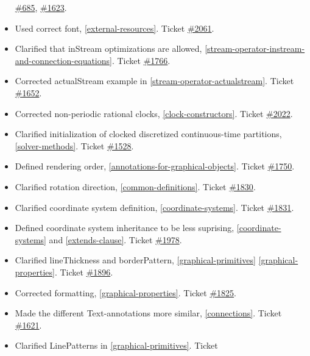 \documentclass[../MLS.tex]{subfiles}
\begin{document}
\begin{itemize}
  \href{https://trac.modelica.org/Modelica/ticket/685}{\#685},
  \href{https://trac.modelica.org/Modelica/ticket/1623}{\#1623}.
\item
  Used correct font, \autoref{external-resources}. Ticket
  \href{https://trac.modelica.org/Modelica/ticket/2061}{\#2061}.
\item
  Clarified that inStream optimizations are allowed, \autoref{stream-operator-instream-and-connection-equations}.
  Ticket \href{https://trac.modelica.org/Modelica/ticket/1766}{\#1766}.
\item
  Corrected actualStream example in \autoref{stream-operator-actualstream}. Ticket
  \href{https://trac.modelica.org/Modelica/ticket/1652}{\#1652}.
\item
  Corrected non-periodic rational clocks, \autoref{clock-constructors}. Ticket
  \href{https://trac.modelica.org/Modelica/ticket/2022}{\#2022}.
\item
  Clarified initialization of clocked discretized continuous-time
  partitions, \autoref{solver-methods}. Ticket
  \href{https://trac.modelica.org/Modelica/ticket/1528}{\#1528}.
\item
  Defined rendering order, \autoref{annotations-for-graphical-objects}. Ticket
  \href{https://trac.modelica.org/Modelica/ticket/1750}{\#1750}.
\item
  Clarified rotation direction, \autoref{common-definitions}. Ticket
  \href{https://trac.modelica.org/Modelica/ticket/1830}{\#1830}.
\item
  Clarified coordinate system definition, \autoref{coordinate-systems}. Ticket
  \href{https://trac.modelica.org/Modelica/ticket/1831}{\#1831}.
\item
  Defined coordinate system inheritance to be less suprising, 
  \autoref{coordinate-systems} and \autoref{extends-clause}. Ticket
  \href{https://trac.modelica.org/Modelica/ticket/1978}{\#1978}.
\item
  Clarified lineThickness and borderPattern, \autoref{graphical-primitives} \autoref{graphical-properties}.
  Ticket \href{https://trac.modelica.org/Modelica/ticket/1896}{\#1896}.
\item
  Corrected formatting, \autoref{graphical-properties}. Ticket
  \href{https://trac.modelica.org/Modelica/ticket/1825}{\#1825}.
\item
  Made the different Text-annotations more similar, \autoref{connections}.
  Ticket \href{https://trac.modelica.org/Modelica/ticket/1621}{\#1621}.
\item
  Clarified LinePatterns in \autoref{graphical-primitives}. Ticket

\end{itemize}
\end{document}
